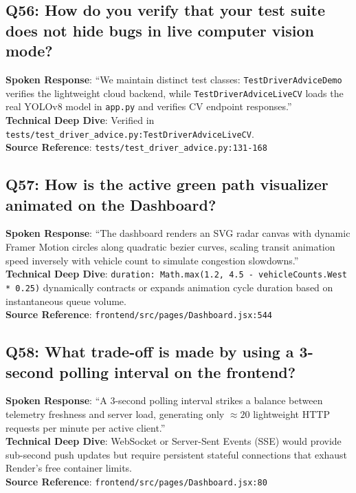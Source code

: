 \documentclass[11pt,a4paper,oneside]{report}
\begin{document}
\subsection*{Q56: How do you verify that your test suite does not hide bugs in live computer vision mode?}
\begin{interviewbox}
\textbf{Spoken Response}: ``We maintain distinct test classes: \texttt{TestDriverAdviceDemo} verifies the lightweight cloud backend, while \texttt{TestDriverAdviceLiveCV} loads the real YOLOv8 model in \texttt{app.py} and verifies CV endpoint responses.''\\
\textbf{Technical Deep Dive}: Verified in \texttt{tests/test\_driver\_advice.py:TestDriverAdviceLiveCV}.\\
\textbf{Source Reference}: \texttt{tests/test\_driver\_advice.py:131-168}
\end{interviewbox}

\subsection*{Q57: How is the active green path visualizer animated on the Dashboard?}
\begin{interviewbox}
\textbf{Spoken Response}: ``The dashboard renders an SVG radar canvas with dynamic Framer Motion circles along quadratic bezier curves, scaling transit animation speed inversely with vehicle count to simulate congestion slowdowns.''\\
\textbf{Technical Deep Dive}: \texttt{duration: Math.max(1.2, 4.5 - vehicleCounts.West * 0.25)} dynamically contracts or expands animation cycle duration based on instantaneous queue volume.\\
\textbf{Source Reference}: \texttt{frontend/src/pages/Dashboard.jsx:544}
\end{interviewbox}

\subsection*{Q58: What trade-off is made by using a 3-second polling interval on the frontend?}
\begin{interviewbox}
\textbf{Spoken Response}: ``A 3-second polling interval strikes a balance between telemetry freshness and server load, generating only $\approx 20$ lightweight HTTP requests per minute per active client.''\\
\textbf{Technical Deep Dive}: WebSocket or Server-Sent Events (SSE) would provide sub-second push updates but require persistent stateful connections that exhaust Render's free container limits.\\
\textbf{Source Reference}: \texttt{frontend/src/pages/Dashboard.jsx:80}
\end{interviewbox}
\end{document}
